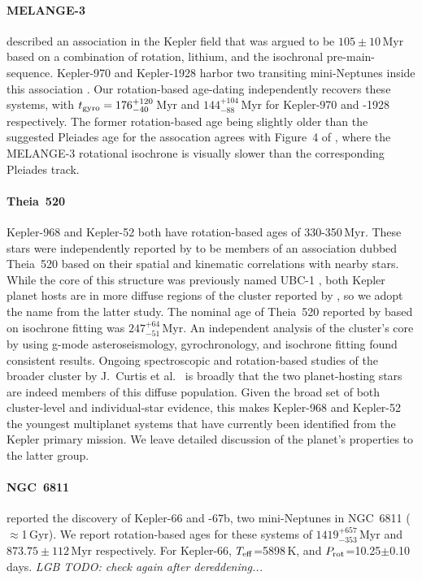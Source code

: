 \documentclass[11pt,twocolumn,tighten]{aastex63}
\begin{document}
\paragraph{MELANGE-3}
\citet{2022AJ....164...88B} described an association in the Kepler
field that was argued to be $105\pm10$\,Myr based on a combination of
rotation, lithium, and the isochronal pre-main-sequence.  Kepler-970
and Kepler-1928 harbor two transiting mini-Neptunes inside this
association \citep{2022AJ....164...88B}.  Our rotation-based
age-dating independently recovers these systems, with $t_{\rm
gyro}=176_{-40}^{+120}$\,Myr and $144_{-88}^{+104}$\,Myr for
Kepler-970 and -1928 respectively.  The former rotation-based age
being slightly older than the suggested Pleiades age for the
assocation agrees with Figure~4 of \citet{2022AJ....164...88B}, where
the MELANGE-3 rotational isochrone is visually slower than
the corresponding Pleiades track.

\paragraph{Theia~520}
Kepler-968 and Kepler-52 both have rotation-based ages of
330-350\,Myr.  These stars were independently reported by
\citet{2019AJ....158..122K} to be members of an association dubbed
Theia~520 based on their spatial and kinematic correlations with
nearby stars.  While the core of this structure was previously named
UBC-1 \citep{2018A&A...618A..59C}, both Kepler planet hosts are in
more diffuse regions of the cluster reported by
\citet{2019AJ....158..122K}, so we adopt the name from the latter
study.  The nominal age of Theia~520 reported by
\citet{2019AJ....158..122K} based on isochrone fitting was
$247^{+64}_{-51}$\,Myr.  An independent analysis of the cluster's core
by \citet{2024A&A...681A..13F} using g-mode asteroseismology,
gyrochronology, and isochrone fitting found consistent results.
Ongoing spectroscopic and rotation-based studies of the broader
cluster by J.~Curtis et al.~ is broadly that the two planet-hosting
stars are indeed members of this diffuse population.  Given the broad
set of both cluster-level and individual-star evidence, this makes
Kepler-968 and Kepler-52 the youngest multiplanet systems that have
currently been identified from the Kepler primary mission.
We leave detailed discussion of the planet's properties to the latter 
group.

\paragraph{NGC~6811}
\citet{Meibom_2013} reported the discovery of Kepler-66 and -67b, two
mini-Neptunes in NGC~6811 ($\approx$1\,Gyr).
We report rotation-based ages for these systems of
$1419^{+657}_{-353}$\,Myr and $873.75\pm{112}$\,Myr respectively.
For Kepler-66, $T_{\rm eff}$=5898\,K, and $P_{\rm
rot}$=10.25$\pm$0.10\,days.
{\it LGB TODO: check again after dereddening...}
\end{document}
